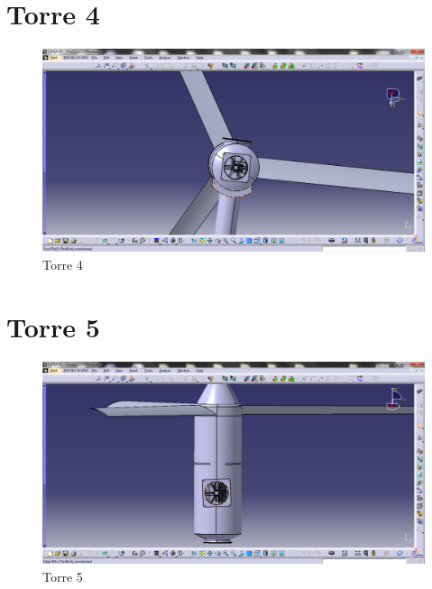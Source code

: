 \section{Torre 4}
\begin{figure}[!htbp]
	  \centering
	  \includegraphics[scale=0.45]{editaveis/figuras/C_torre4}
	  \caption[Torre4]{Torre 4}
	  \label{Torre4}
	\end{figure}
	\FloatBarrier

\section{Torre 5}
\begin{figure}[!htbp]
	  \centering
	  \includegraphics[scale=0.45]{editaveis/figuras/C_torre5}
	  \caption[Torre5]{Torre 5}
	  \label{Torre2}
	\end{figure}
	\FloatBarrier

